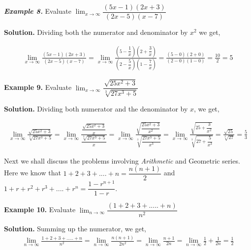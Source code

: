 \documentclass[../../main.tex]{subfiles}
\begin{document}
\vspace{0.2cm}
\textbf{\textit{Example 8.}}
\vspace{0.2cm}
Evaluate  $\lim_{x \rightarrow \infty}\dfrac{(5x-1)(2x+3)}{(2x-5)(x-7)}$
    
\textbf{Solution.} Dividing both the numerator and denominator by $x^2$ we get,

\begin{align*}
  \lim_{x \rightarrow \infty}\frac{(5x-1)(2x+3)}{(2x-5)(x-7)} =  \lim_{x\to\infty} \frac{(5-\dfrac{1}{x})(2+\dfrac{3}{x})}{(2-\dfrac{5}{x})(1-\dfrac{7}{x})}
  = \frac{(5-0)(2+0)}{(2-0)(1-0)} = \frac{10}{2} = 5
\end{align*}
 

\vspace{0.2cm}
\textbf{Example 9.}
\vspace{0.2cm}
Evaluate  $\lim_{x \rightarrow \infty}\dfrac{\sqrt{25x^2+3}}{\sqrt[3]{27x^3+5}}$
    
\textbf{Solution.} Dividing both numerator and the denominator by $x$, we get,

\begin{align*}
    \lim_{x \rightarrow \infty}\frac{\sqrt{25x^2+3}}{\sqrt[3]{27x^3+5}}=\lim_{x \rightarrow \infty}\frac{\dfrac{\sqrt{25x^2+3}}{x}}{\dfrac{\sqrt[3]{27x^3+5}}{x}} = \lim_{x\rightarrow\infty}\frac{\sqrt{\dfrac{25x^2+3}{x^2}}}{\sqrt[3]{\dfrac{27x^3+5}{x^3}}}
    = \lim_{x\rightarrow\infty}\frac{\sqrt{25+\dfrac{3}{x^2}}}{\sqrt[3]{27+\dfrac{5}{x^3}}} = \frac{\sqrt{25}}{\sqrt[3]{27}} = \frac{5}{3}
\end{align*}
    

Next we shall discuss the problems involving \emph{Arithmetic} and \emph{}{Geometric series}. Here we know that $1+2+3+....+n = \dfrac{n(n+1)}{2}$ and $1+r+r^2+r^3+....+r^n =\dfrac{1-r^{n+1}}{1-r}$.

\vspace{0.2cm}
\textbf{Example 10.} 
\vspace{0.2cm}
Evaluate  $\lim_{n \rightarrow \infty}\dfrac{(1+2+3+.....+n)}{n^2}$
    
\textbf{Solution.} Summing up the numerator, we get,
\begin{align*}
    \lim_{n \rightarrow \infty}\frac{{1+2+3+.....+n}}{n^2} = \lim_{n \rightarrow \infty}\frac{n(n+1)}{2n^2} = \lim_{n \rightarrow \infty}\frac{n+1}{2n} = \lim_{n\to\infty} \frac{1}{2}+\frac{1}{2n} = \frac{1}{2}
\end{align*}
\end{document}
